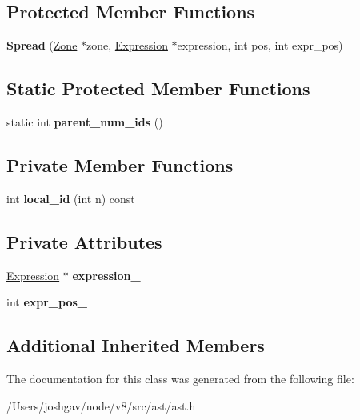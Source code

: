 \subsection*{Protected Member Functions}
\begin{DoxyCompactItemize}
\item 
{\bfseries Spread} (\hyperlink{classv8_1_1internal_1_1_zone}{Zone} $\ast$zone, \hyperlink{classv8_1_1internal_1_1_expression}{Expression} $\ast$expression, int pos, int expr\+\_\+pos)\hypertarget{classv8_1_1internal_1_1_spread_a06d441da7a8ab11da7040817cb47f22d}{}\label{classv8_1_1internal_1_1_spread_a06d441da7a8ab11da7040817cb47f22d}

\end{DoxyCompactItemize}
\subsection*{Static Protected Member Functions}
\begin{DoxyCompactItemize}
\item 
static int {\bfseries parent\+\_\+num\+\_\+ids} ()\hypertarget{classv8_1_1internal_1_1_spread_ac5d4f120817868c70d101704762044c4}{}\label{classv8_1_1internal_1_1_spread_ac5d4f120817868c70d101704762044c4}

\end{DoxyCompactItemize}
\subsection*{Private Member Functions}
\begin{DoxyCompactItemize}
\item 
int {\bfseries local\+\_\+id} (int n) const \hypertarget{classv8_1_1internal_1_1_spread_a59046b4aa916804ed8c035ed700d2766}{}\label{classv8_1_1internal_1_1_spread_a59046b4aa916804ed8c035ed700d2766}

\end{DoxyCompactItemize}
\subsection*{Private Attributes}
\begin{DoxyCompactItemize}
\item 
\hyperlink{classv8_1_1internal_1_1_expression}{Expression} $\ast$ {\bfseries expression\+\_\+}\hypertarget{classv8_1_1internal_1_1_spread_a4deb2e5f9e22776b6e2ac6817bcfc02c}{}\label{classv8_1_1internal_1_1_spread_a4deb2e5f9e22776b6e2ac6817bcfc02c}

\item 
int {\bfseries expr\+\_\+pos\+\_\+}\hypertarget{classv8_1_1internal_1_1_spread_a2b98a1ed7327b86a8c92685187d64c3d}{}\label{classv8_1_1internal_1_1_spread_a2b98a1ed7327b86a8c92685187d64c3d}

\end{DoxyCompactItemize}
\subsection*{Additional Inherited Members}


The documentation for this class was generated from the following file\+:\begin{DoxyCompactItemize}
\item 
/\+Users/joshgav/node/v8/src/ast/ast.\+h\end{DoxyCompactItemize}
